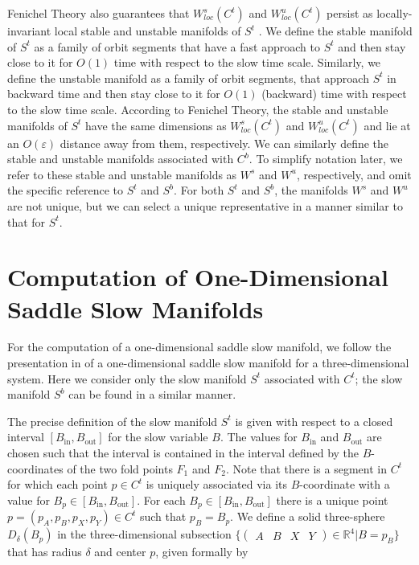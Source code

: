 \documentclass{ws-ijbc}
\begin{document}
Fenichel Theory also guarantees that $W^{s}_{loc}(C^t)$ and $W^{u}_{loc}(C^t)$ persist as locally-invariant local stable and unstable manifolds of $S^t$ \cite{Fenichel}.  We define the stable manifold of $S^t$ as a family of orbit segments that have a fast approach to $S^t$ and then stay close to it for $O(1)$ time with respect to the slow time scale.  Similarly, we define the unstable manifold as a family of orbit segments, that approach $S^t$ in backward time and then stay close to it for $O(1)$ (backward) time with respect to the slow time scale.  According to Fenichel Theory, the stable and unstable manifolds of $S^t$ have the same dimensions as $W^{s}_{loc}(C^t)$ and $W^{u}_{loc}(C^t)$ and lie at an $O(\varepsilon)$ distance away from them, respectively.  We can similarly define the stable and unstable manifolds associated with $C^b$.  To simplify notation later, we refer to these stable and unstable manifolds as $W^s$ and $W^u$, respectively, and omit the specific reference to $S^t$ and $S^b$.  For both $S^t$ and $S^b$, the manifolds $W^s$ and $W^u$ are not unique, but we can select a unique representative in a manner similar to that for $S^t$.
 
 \section{Computation of One-Dimensional Saddle Slow Manifolds}
    
For the computation of a one-dimensional saddle slow manifold, we follow the presentation in \cite{Saeed_Paper} of a one-dimensional saddle slow manifold for a three-dimensional system.  Here we consider only the slow manifold $S^t$ associated with $C^t$; the slow manifold $S^b$ can be found in a similar manner.
    
The precise definition of the slow manifold $S^t$ is given with respect to a closed interval $[B_{\mathrm{in}},B_{\mathrm{out}}]$ for the slow variable $B$.  The values for $B_{\mathrm{in}}$ and $B_{\mathrm{out}}$ are chosen such that the interval is contained in the interval defined by the $B$-coordinates of the two fold points $F_1$ and $F_2$.  Note that there is a segment in $C^t$ for which each point $p \in C^t$ is uniquely associated via its $B$-coordinate with a value for $B_p \in [B_{\mathrm{in}},B_{\mathrm{out}}]$.  For each $B_p \in [B_{\mathrm{in}},B_{\mathrm{out}}]$ there is a unique point $p=(p_A,p_B,p_X,p_Y) \in C^t$ such that $p_B = B_p$.  We define a solid three-sphere $D_\delta(B_p)$ in the three-dimensional subsection $\{ \begin{pmatrix} A & B & X & Y \end{pmatrix} \in \mathbb{R}^4| B=p_B\}$ that has radius $\delta$ and center $p$, given formally by
\end{document}
